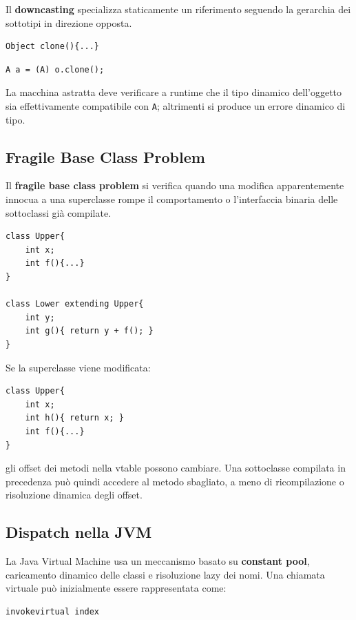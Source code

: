 \documentclass{article}
\begin{document}
Il \textbf{downcasting} specializza staticamente un riferimento seguendo la gerarchia dei sottotipi in direzione opposta.

\begin{lstlisting}
Object clone(){...}
\end{lstlisting}

\begin{lstlisting}
A a = (A) o.clone();
\end{lstlisting}

La macchina astratta deve verificare a runtime che il tipo dinamico dell'oggetto sia effettivamente compatibile con \texttt{A}; altrimenti si produce un errore dinamico di tipo.

\subsection{Fragile Base Class Problem}

Il \textbf{fragile base class problem} si verifica quando una modifica apparentemente innocua a una superclasse rompe il comportamento o l'interfaccia binaria delle sottoclassi già compilate.

\begin{lstlisting}
class Upper{
    int x;
    int f(){...}
}

class Lower extending Upper{
    int y;
    int g(){ return y + f(); }
}
\end{lstlisting}

Se la superclasse viene modificata:

\begin{lstlisting}
class Upper{
    int x;
    int h(){ return x; }
    int f(){...}
}
\end{lstlisting}

gli offset dei metodi nella vtable possono cambiare. Una sottoclasse compilata in precedenza può quindi accedere al metodo sbagliato, a meno di ricompilazione o risoluzione dinamica degli offset.

\subsection{Dispatch nella JVM}

La Java Virtual Machine usa un meccanismo basato su \textbf{constant pool}, caricamento dinamico delle classi e risoluzione lazy dei nomi. Una chiamata virtuale può inizialmente essere rappresentata come:

\begin{lstlisting}
invokevirtual index
\end{lstlisting}
\end{document}
